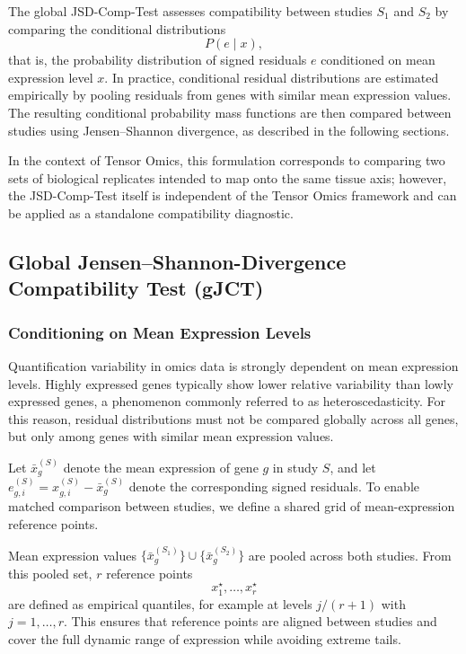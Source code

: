 The global JSD-Comp-Test assesses compatibility between studies $S_1$ and $S_2$ by comparing the conditional distributions
\[
P(e \mid x),
\]
that is, the probability distribution of signed residuals $e$ conditioned on mean expression level $x$. In practice, conditional residual distributions are estimated empirically by pooling residuals from genes with similar mean expression values. The resulting conditional probability mass functions are then compared between studies using Jensen--Shannon divergence, as described in the following sections.

In the context of Tensor Omics, this formulation corresponds to comparing two sets of biological replicates intended to map onto the same tissue axis; however, the JSD-Comp-Test itself is independent of the Tensor Omics framework and can be applied as a standalone compatibility diagnostic.

\subsection{Global Jensen--Shannon-Divergence Compatibility Test (gJCT)}

\subsubsection{Conditioning on Mean Expression Levels}

Quantification variability in omics data is strongly dependent on mean expression levels. Highly expressed genes typically show lower relative variability than lowly expressed genes, a phenomenon commonly referred to as heteroscedasticity. For this reason, residual distributions must not be compared globally across all genes, but only among genes with similar mean expression values.

Let $\bar{x}^{(S)}_g$ denote the mean expression of gene $g$ in study $S$, and let $e^{(S)}_{g,i} = x^{(S)}_{g,i} - \bar{x}^{(S)}_g$ denote the corresponding signed residuals. To enable matched comparison between studies, we define a shared grid of mean-expression reference points.

Mean expression values $\{\bar{x}^{(S_1)}_g\} \cup \{\bar{x}^{(S_2)}_g\}$ are pooled across both studies. From this pooled set, $r$ reference points
\[
x^\star_1, \ldots, x^\star_r
\]
are defined as empirical quantiles, for example at levels $j/(r+1)$ with $j=1,\ldots,r$. This ensures that reference points are aligned between studies and cover the full dynamic range of expression while avoiding extreme tails.

